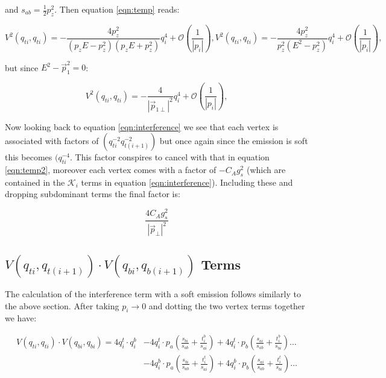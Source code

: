 		and $s_{ab}=\frac12p_z^2$.  Then equation \ref{eqn:temp} reads:

		\begin{subequations}
			\begin{equation}
			V^2(q_{ti}, q_{ti}) = - \frac{4p_z^2}{(p_zE - p_z^2)(p_zE + p_z^2)}q^4_{i} + \mathcal{O}\left(\frac{1}{|p_i|}\right),
			\end{equation}
			\begin{equation}
			V^2(q_{ti}, q_{ti}) = - \frac{4p_z^2}{p_z^2(E^2-p_z^2)}q^4_{i} + \mathcal{O}\left(\frac{1}{|p_i|}\right),
			\end{equation}
		\end{subequations}

		but since $E^2-\vec{p}_1^2=0$:

		\begin{equation}
			V^2(q_{ti}, q_{ti}) = - \frac{4}{|\vec{p}_{1\perp}|^2}q^4_{i} + \mathcal{O}\left(\frac{1}{|p_i|}\right),
			\label{eqn:temp2}
		\end{equation}

		Now looking back to equation \ref{eqn:interference} we see that each vertex is associated with factors of
		$(q^{-2}_{ti}q^{-2}_{t(i+1)})$ but once again since the emission is soft this becomes $(q^{-4}_{ti}$.
		This factor conspires to cancel with that in equation \ref{eqn:temp2}, moreover each vertex comes with a
		factor of $-C_Ag^2_s$ (which are contained in the $\mathcal{K}_i$ terms in equation \ref{eqn:interference}).
		Including these and dropping subdominant terms the final factor is:

		\begin{equation}
			\frac{4C_Ag_s^2}{|\vec{p}_\perp|^2}
			\label{eqn:finalsoft}
		\end{equation}

	\subsection{$V(q_{ti}, q_{t(i+1)})\cdot V(q_{bi}, q_{b(i+1)})$ Terms}
	\label{sub:subsection_name}

		The calculation of the interference term with a soft emission follows similarly to the above section.
		After taking $p_i\rightarrow0$ and dotting the two vertex terms together we have:

		\begin{equation}
		\begin{split}
			V(q_{ti}, q_{ti})\cdot V(q_{bi}, q_{bi}) = 4q_i^t\cdot q_i^b &- 4q_i^t\cdot p_a\left(\frac{s_{bi}}{s_{ab}} +
				\frac{t_i^b}{s_{ai}}\right) + 4q_i^t\cdot p_b\left(\frac{s_{ai}}{s_{ab}} + \frac{t_i^b}{s_{bi}}\right) \ldots\\
				&- 4q_i^b\cdot p_a\left(\frac{s_{bi}}{s_{ab}} + \frac{t_i^t}{s_{ai}}\right) +
				4q_i^b\cdot p_b\left(\frac{s_{ai}}{s_{ab}} +
				\frac{t_i^t}{s_{bi}}\right) \ldots\\
		\end{split}
		\end{equation}


